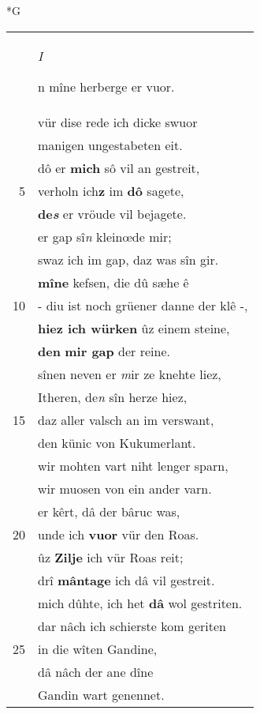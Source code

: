 \documentclass[8pt,a4paper,notitlepage]{article}
\begin{document}
\newpage
\begin{table}[ht]
\begin{minipage}[t]{0.5\linewidth}
\small
\begin{center}*G
\end{center}
\begin{tabular}{rl}
 & \begin{large}\textit{I}\end{large}n mîne herberge er vuor.\\ 
 & vür dise rede ich dicke swuor\\ 
 & manigen ungestabeten eit.\\ 
 & dô er \textbf{mich} sô vil an gestreit,\\ 
5 & verholn ich\textbf{z} im \textbf{dô} sagete,\\ 
 & \textbf{de\textit{s}} er vröude vil bejagete.\\ 
 & er gap sî\textit{n} kleinœde mir;\\ 
 & swaz ich im gap, daz was sîn gir.\\ 
 & \textbf{mîne} kefsen, die dû sæhe ê\\ 
10 & - diu ist noch grüener danne der klê -,\\ 
 & \textbf{hiez ich würken} ûz einem steine,\\ 
 & \textbf{den} \textbf{mir gap} der reine.\\ 
 & sînen neven er \textit{m}ir ze knehte liez,\\ 
 & Itheren, de\textit{n} sîn herze hiez,\\ 
15 & daz aller valsch an im verswant,\\ 
 & den künic von Kukumerlant.\\ 
 & wir mohten vart niht lenger sparn,\\ 
 & wir muosen von ein ander varn.\\ 
 & er kêrt, dâ der bâruc was,\\ 
20 & unde ich \textbf{vuor} vür den Roas.\\ 
 & ûz \textbf{Zilje} ich vür Roas reit;\\ 
 & drî \textbf{mântage} ich dâ vil gestreit.\\ 
 & mich dûhte, ich het \textbf{dâ} wol gestriten.\\ 
 & dar nâch ich schierste kom geriten\\ 
25 & in die wîten Gandine,\\ 
 & dâ nâch der ane dîne\\ 
 & Gandin wart genennet.\\ 

\end{tabular}
\end{minipage}
\end{table}
\end{document}
